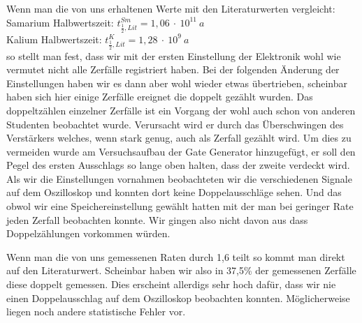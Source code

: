 \documentclass[12pt]{article}
\begin{document}
Wenn man die von uns erhaltenen Werte mit den Literaturwerten vergleicht:
Samarium Halbwertszeit: $t_{\frac{1}{2}, Lit}^{Sm} = 1,06~\cdot~10^{11}~a$\\
Kalium Halbwertszeit: $t_{\frac{1}{2}, Lit}^K = 1,28~\cdot~10^{9}~a$\\
so stellt man fest, dass wir mit der ersten Einstellung der Elektronik wohl wie vermutet nicht alle Zerfälle registriert haben. Bei der folgenden Änderung der Einstellungen haben wir es dann aber wohl wieder etwas übertrieben, scheinbar haben sich hier einige Zerfälle ereignet die doppelt gezählt wurden.
Das doppeltzählen einzelner Zerfälle ist ein Vorgang der wohl auch schon von anderen Studenten beobachtet wurde. Verursacht wird er durch das Überschwingen des Verstärkers welches, wenn stark genug, auch als Zerfall gezählt wird. Um dies zu vermeiden wurde am Versuchsaufbau der Gate Generator hinzugefügt, er soll den Pegel des ersten Ausschlags so lange oben halten, dass der zweite verdeckt wird. Als wir die Einstellungen vornahmen beobachteten wir die verschiedenen Signale auf dem Oszilloskop und konnten dort keine Doppelausschläge sehen. Und das obwol wir eine Speichereinstellung gewählt hatten mit der man bei geringer Rate jeden Zerfall beobachten konnte. Wir gingen also nicht davon aus dass Doppelzählungen vorkommen würden.

Wenn man die von uns gemessenen Raten durch 1,6 teilt so kommt man direkt auf den Literaturwert. Scheinbar haben wir also in 37,5\% der gemessenen Zerfälle diese doppelt gemessen. 
Dies erscheint allerdigs sehr hoch dafür, dass wir nie einen Doppelausschlag auf dem Oszilloskop beobachten konnten. Möglicherweise liegen noch andere statistische Fehler vor.
\end{document}

